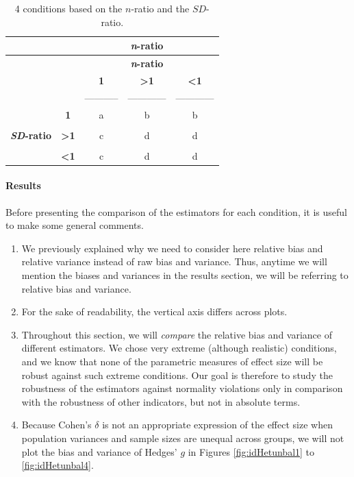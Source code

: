 \documentclass[
  english,
  man,floatsintext]{apa6}
\let\oldparagraph\paragraph
\renewcommand{\paragraph}[1]{\oldparagraph{#1}\mbox{}}
\begin{document}
\newpage

\begin{longtable}[]{@{}ccccc@{}}
\caption{4 conditions based on the \(n\)-ratio and the \(SD\)-ratio.}\tabularnewline
\toprule
& & & \textbf{\emph{n}-ratio} & \\
\midrule
\endfirsthead
\toprule
& & & \textbf{\emph{n}-ratio} & \\
\midrule
\endhead
& & \textbf{1} & \textbf{\textgreater1} & \textbf{\textless1} \\
& & ----------- & ------------ & ------------ \\
& \textbf{1} & a & b & b \\
& & & & \\
\textbf{\emph{SD}-ratio} & \textbf{\textgreater1} & c & d & d \\
& & & & \\
& \textbf{\textless1} & c & d & d \\
\bottomrule
\end{longtable}

\hypertarget{results}{%
\paragraph{Results}\label{results}}

Before presenting the comparison of the estimators for each condition, it is useful to make some general comments.

\begin{enumerate}
\def\labelenumi{\arabic{enumi})}
\item
  We previously explained why we need to consider here relative bias and relative variance instead of raw bias and variance. Thus, anytime we will mention the biases and variances in the results section, we will be referring to relative bias and variance.
\item
  For the sake of readability, the vertical axis differs across plots.
\item
  Throughout this section, we will \emph{compare} the relative bias and variance of different estimators. We chose very extreme (although realistic) conditions, and we know that none of the parametric measures of effect size will be robust against such extreme conditions. Our goal is therefore to study the robustness of the estimators against normality violations only in comparison with the robustness of other indicators, but not in absolute terms.
\item
  Because Cohen's \(\delta\) is not an appropriate expression of the effect size when population variances and sample sizes are unequal across groups, we will not plot the bias and variance of Hedges' \(g\) in Figures \ref{fig:idHetunbal1} to \ref{fig:idHetunbal4}.
\end{enumerate}
\end{document}
